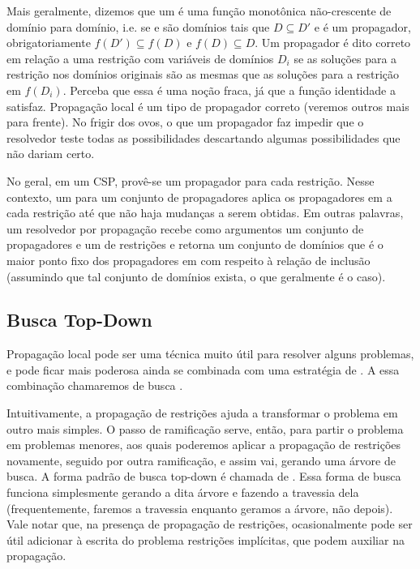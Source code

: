 Mais geralmente, dizemos que um  é uma função
monotônica não-crescente de domínio para domínio, i.e. se 
e  são domínios tais que $D \subseteq D'$ e 
é um propagador, obrigatoriamente $f(D') \subseteq f(D)$ e $f(D)
\subseteq D$. Um propagador é dito correto em relação a uma restrição
 com variáveis de domínios $D_i$ se as soluções para a
restrição nos domínios originais são as mesmas que as soluções para a
restrição em $f(D_i)$.  Perceba que essa é uma noção fraca, já que a
função identidade a satisfaz. Propagação local é um tipo de propagador
correto (veremos outros mais para frente). No frigir dos ovos, o que
um propagador faz impedir que o resolvedor teste todas as
possibilidades descartando algumas possibilidades que não dariam
certo.

No geral, em um CSP, provê-se um propagador para cada restrição. Nesse
contexto, um  para um conjunto de
propagadores  aplica os propagadores em  a
cada restrição até que não haja mudanças a serem obtidas. Em outras
palavras, um resolvedor  por propagação recebe como
argumentos um conjunto de propagadores  e um de restrições
 e retorna um conjunto de domínios que é o maior ponto
fixo dos propagadores em  com respeito à relação de
inclusão (assumindo que tal conjunto de domínios exista, o que
geralmente é o caso).

\subsection{Busca Top-Down}

Propagação local pode ser uma técnica muito útil para resolver alguns
problemas, e pode ficar mais poderosa ainda se combinada com uma
estratégia de . A essa combinação chamaremos de
busca .

Intuitivamente, a propagação de restrições ajuda a transformar o
problema em outro mais simples. O passo de ramificação serve, então,
para partir o problema em problemas menores, aos quais poderemos
aplicar a propagação de restrições novamente, seguido por outra
ramificação, e assim vai, gerando uma árvore de busca. A forma padrão
de busca top-down é chamada de . Essa forma de busca funciona simplesmente gerando a
dita árvore e fazendo a travessia dela (frequentemente, faremos a
travessia enquanto geramos a árvore, não depois). Vale notar que, na
presença de propagação de restrições, ocasionalmente pode ser útil
adicionar à escrita do problema restrições implícitas, que podem
auxiliar na propagação.

